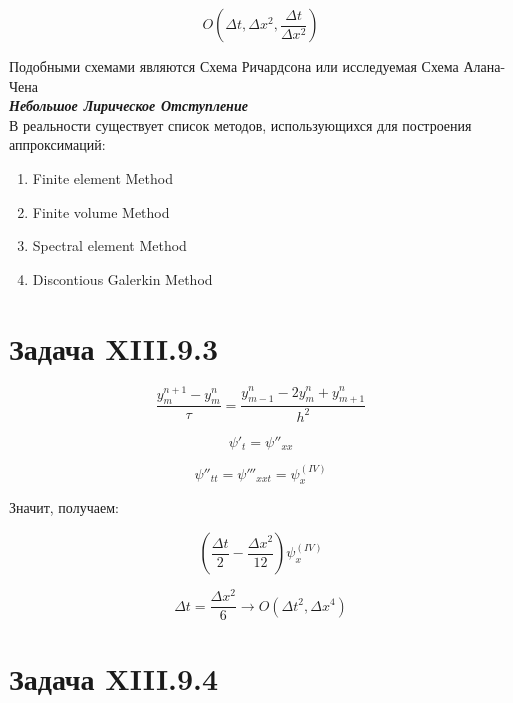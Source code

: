 \documentclass[10pt,a4paper]{article}
\begin{document}
	\begin{equation}
		O\left(\Delta t, \Delta x^{2}, \frac{\Delta t}{\Delta x^{2}}\right)
	\end{equation}
	
	Подобными схемами являются Схема Ричардсона или исследуемая Схема Алана-Чена
	\vspace{0.5cm}\\
	\textbf{\textit{Небольшое Лирическое Отступление}}
	\vspace{0.5cm}\\
	В реальности существует список методов, использующихся для построения 
	аппроксимаций:
	
	\begin{enumerate}
		\item Finite element Method
		\item Finite volume Method
		\item Spectral element Method
		\item Discontious Galerkin Method
	\end{enumerate}

	\section{Задача XIII.9.3}
	
	\begin{equation}
		\frac{y^{n + 1}_{m} - y^{n}_{m}}{\tau} = \frac{y^{n}_{m - 1} - 2
		y^{n}_{m} + y^{n}_{m + 1}}{h^{2}}
	\end{equation}
	
	\begin{equation}
		\psi'_{t} = \psi''_{xx}
	\end{equation}
	
	\begin{equation}
		\psi''_{tt} = \psi'''_{xxt} = \psi^{\left(IV\right)}_{x}
	\end{equation}
	
	Значит, получаем:
	
	\begin{equation}
	\left(\frac{\Delta t}{2} - \frac{\Delta x^{2}}{12}\right)\psi^{\left(IV
	\right)}_{x}
	\end{equation}
	
	\begin{equation}
		\Delta t = \frac{\Delta x^{2}}{6} \rightarrow O\left(\Delta t^{2},
		\Delta x^{4}\right)
	\end{equation}
	
	\section{Задача XIII.9.4}
	
\end{document}
